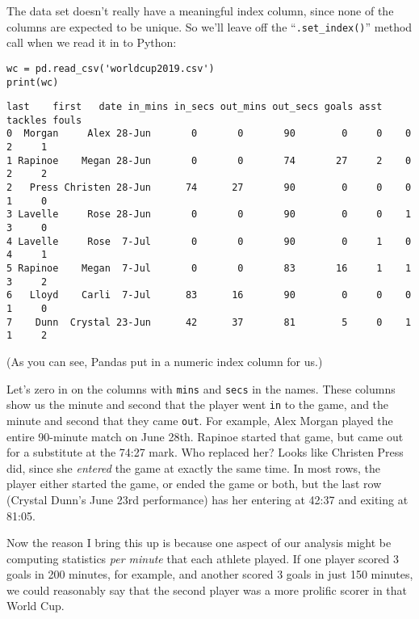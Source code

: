 
The data set doesn't really have a meaningful index column, since none of the
columns are expected to be unique. So we'll leave off the
``\texttt{.set\_index()}'' method call when we read it in to Python:

\begin{samepage}
\begin{Verbatim}[fontsize=\footnotesize,samepage=true,frame=single,framesep=3mm]
wc = pd.read_csv('worldcup2019.csv')
print(wc)
\end{Verbatim}
\vspace{-.2in}

\begin{Verbatim}[fontsize=\scriptsize,samepage=true,frame=leftline,framesep=5mm,framerule=1mm]
     last    first   date in_mins in_secs out_mins out_secs goals asst tackles fouls
0  Morgan     Alex 28-Jun       0       0       90        0     0    0       2     1
1 Rapinoe    Megan 28-Jun       0       0       74       27     2    0       2     2
2   Press Christen 28-Jun      74      27       90        0     0    0       1     0
3 Lavelle     Rose 28-Jun       0       0       90        0     0    1       3     0
4 Lavelle     Rose  7-Jul       0       0       90        0     1    0       4     1
5 Rapinoe    Megan  7-Jul       0       0       83       16     1    1       3     2
6   Lloyd    Carli  7-Jul      83      16       90        0     0    0       1     0
7    Dunn  Crystal 23-Jun      42      37       81        5     0    1       1     2
\end{Verbatim}
\end{samepage}

(As you can see, Pandas put in a numeric index column for us.)

Let's zero in on the columns with \texttt{mins} and \texttt{secs} in the names.
These columns show us the minute and second that the player went \texttt{in} to
the game, and the minute and second that they came \texttt{out}. For example,
Alex Morgan played the entire 90-minute match on June 28th. Rapinoe started
that game, but came out for a substitute at the 74:27 mark. Who replaced her?
Looks like Christen Press did, since she \textit{entered} the game at exactly
the same time. In most rows, the player either started the game, or ended the
game or both, but the last row (Crystal Dunn's June 23rd performance) has her
entering at 42:37 and exiting at 81:05.

Now the reason I bring this up is because one aspect of our analysis might be
computing statistics \textit{per minute} that each athlete played. If one
player scored 3 goals in 200 minutes, for example, and another scored 3 goals
in just 150 minutes, we could reasonably say that the second player was a more
prolific scorer in that World Cup.

